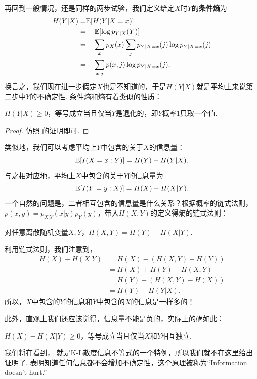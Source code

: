 再回到一般情况，还是同样的两步试验，我们定义给定$X$时$Y$的\textbf{条件熵}为
\begin{align*}
    H(Y| X)=&\mathbb{E}[H(Y|X=x)]\\
    =&-\mathbb{E}[\log p_{Y| X}(Y)]\\
    =&-\sum_x p_{X}(x)\sum_{j}p_{Y|X=x}(j)\log p_{Y|X=x}(j)\\
    =&-\sum_{x,j}p(x,j)\log p_{Y|X=x}(j).
\end{align*}
换言之，我们现在进一步假定$X$也是不知道的，于是$H(Y|X)$就是平均上来说第二步中$Y$的不确定性. 条件熵和熵有着类似的性质：
\begin{proposition}\label{prop:conditional-entropy-nonnegative}
    $H(Y|X)\geq 0$，等号成立当且仅当$Y$是退化的，即$Y$概率$1$只取一个值.
\end{proposition}
\begin{proof}
    仿照 的证明即可.
\end{proof}
类似地，我们可以考虑平均上$Y$中包含的关于$X$的信息量：
\[\mathbb{E}[I(X=x:Y)]=H(Y)-H(Y|X).\]
与之相对应地，平均上$X$中包含的关于$Y$的信息量为
\[\mathbb{E}[I(Y=y:X)]=H(X)-H(X|Y).\]
一个自然的问题是，二者相互包含的信息量是什么关系？根据概率的链式法则，$p(x,y)=p_{X|Y}(x|y)p_Y(y)$，带入$H(X,Y)$的定义得熵的链式法则：

\begin{proposition}\label{prop:entropy-chain-rule}
    对任意离散随机变量$X,Y$，$H(X,Y)=H(Y)+H(X|Y)$.    
\end{proposition}

利用链式法则，我们注意到，
\begin{align*}
    H(X)-H(X|Y)&=H(X)-(H(X,Y)-H(Y))\\
               &=H(X)+H(Y)-H(X,Y)\\
               &=H(Y)-(H(X,Y)-H(X))\\
               &=H(Y)-H(Y|X).
\end{align*}
所以，$X$中包含的$Y$的信息和$Y$中包含的$X$的信息是一样多的！

此外，直观上我们还应该觉得，信息量不能是负的，实际上的确如此：
\begin{proposition}\label{prop:information-doesnt-hurt}
    $H(X)-H(X|Y)\geq 0$，等号成立当且仅当$X$和$Y$相互独立.
\end{proposition}

我们将在看到， 就是K-L散度信息不等式的一个特例，所以我们就不在这里给出证明了.  表明知道任何信息都不会增加不确定性，这个原理被称为“Information doesn't hurt.”

